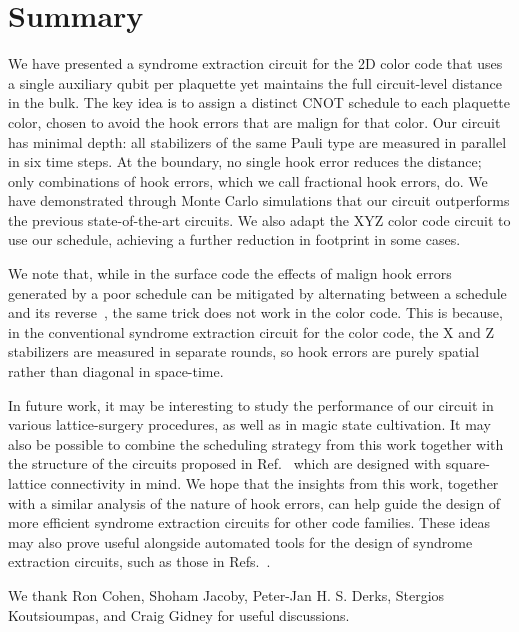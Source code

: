 \documentclass[twocolumn,
aps,
prx,
showpacs,
amsmath,
amssymb,
floatfix,
longbibliography,
superscriptaddress,
eprint]
{revtex4-1}
\begin{document}
\section{Summary}
\label{sec:summary}

We have presented a syndrome extraction circuit for the 2D color code that uses a single auxiliary qubit per plaquette yet maintains the full circuit-level distance in the bulk.
The key idea is to assign a distinct CNOT schedule to each plaquette color, chosen to avoid the hook errors that are malign for that color.
Our circuit has minimal depth: all stabilizers of the same Pauli type are measured in parallel in six time steps.
At the boundary, no single hook error reduces the distance; only combinations of hook errors, which we call fractional hook errors, do.
We have demonstrated through Monte Carlo simulations that our circuit outperforms the previous state-of-the-art circuits.
We also adapt the XYZ color code circuit to use our schedule, achieving a further reduction in footprint in some cases.

We note that, while in the surface code the effects of malign hook errors generated by a poor schedule can be mitigated by alternating between a schedule and its reverse~\cite{bluvstein2025architectural, gidney2024alternating}, the same trick does not work in the color code.
This is because, in the conventional syndrome extraction circuit for the color code, the X and Z stabilizers are measured in separate rounds, so hook errors are purely spatial rather than diagonal in space-time.

In future work, it may be interesting to study the performance of our circuit in various lattice-surgery procedures, as well as in magic state cultivation.
It may also be possible to combine the scheduling strategy from this work together with the structure of the circuits proposed in Ref.~\cite{gidney2023colorcode} which are designed with square-lattice connectivity in mind.
We hope that the insights from this work, together with a similar analysis of the nature of hook errors, can help guide the design of more efficient syndrome extraction circuits for other code families.
These ideas may also prove useful alongside automated tools for the design of syndrome extraction circuits, such as those in Refs.~\cite{prophunt2026,alphasyndrome2026}.

\acknowledgments

We thank Ron Cohen, Shoham Jacoby, Peter-Jan H. S. Derks, Stergios Koutsioumpas, and Craig Gidney for useful discussions.
\end{document}
